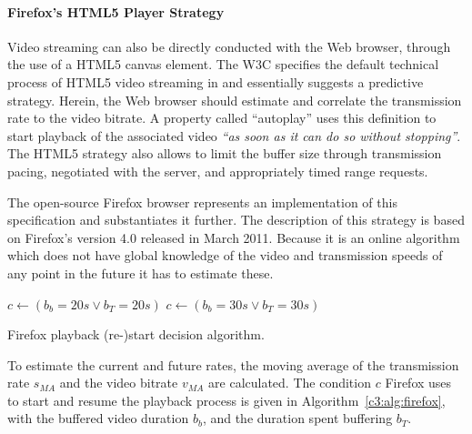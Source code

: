 \paragraph{Firefox's HTML5 Player Strategy}

Video streaming can also be directly conducted with the Web browser, through the use of a \acrshort{HTML}5 canvas element. The \gls{W3C} specifies the default technical process of \acrshort{HTML}5 video streaming in \cite{html5video} and essentially suggests a predictive strategy. Herein, the Web browser should estimate and correlate the transmission rate to the video bitrate. A property called ``autoplay'' uses this definition to start playback of the associated video \textit{\enquote{as soon as it can do so without stopping}}. The \acrshort{HTML}5 strategy also allows to limit the buffer size through transmission pacing, negotiated with the server, and appropriately timed range requests.

The open-source Firefox browser represents an implementation of this specification and substantiates it further. The description of this strategy is based on Firefox's version 4.0 released in March 2011. Because it is an online algorithm which does not have global knowledge of the video and transmission speeds of any point in the future it has to estimate these.

\begin{algorithm}[htb]
	\centering
	\begin{algorithmic}
		\STATE $c \gets ( b_b=20s \lor b_T=20s )$
	\ELSE
		\STATE $c \gets ( b_b=30s \lor b_T=30s )$
	\ENDIF
	\end{algorithmic}
	\caption{Firefox playback (re-)start decision algorithm.}
\label{c3:alg:firefox}
\end{algorithm}

To estimate the current and future rates, the moving average of the transmission rate $s_{MA}$ and the video bitrate $v_{MA}$ are calculated. The condition $c$ Firefox uses to start and resume the playback process is given in Algorithm~\ref{c3:alg:firefox}, with the buffered video duration $b_b$, and the duration spent buffering $b_T$.

